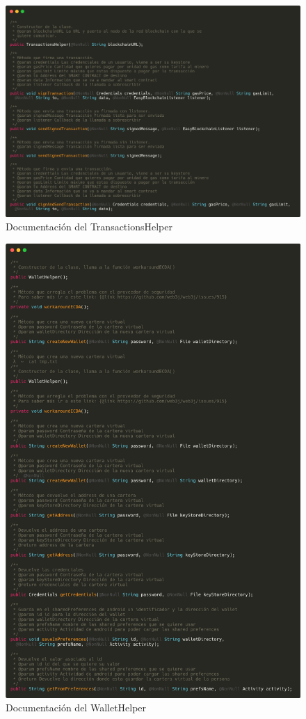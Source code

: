 \begin{figure}[h!]
  \centering
  \includegraphics[width=1\linewidth]{figs/Anexo/Docs/trans}
  \caption[Documentación de TransactionsHelper]{Documentación del TransactionsHelper}
  \label{fig:docsTransHelper}
\end{figure}

\begin{figure}[h!]
  \centering
  \includegraphics[width=1\linewidth]{figs/Anexo/Docs/wallet}
  \caption[Documentación de WalletHelper]{Documentación del WalletHelper}
  \label{fig:docsWalletHelper}
\end{figure}

